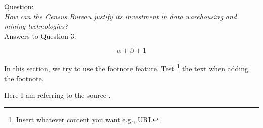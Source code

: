 Question:\\
\emph{
    How can the Census Bureau justify its investment in data warehousing and mining
technologies?
}\\

Answers to Question 3:

\begin{equation}
\alpha + \beta + 1
\end{equation}

In this section, we try to use the footnote feature. Test \footnote{Insert whatever content you want e.g., URL} the text when adding the footnote.

Here I am referring to the source \cite{DataScience}.